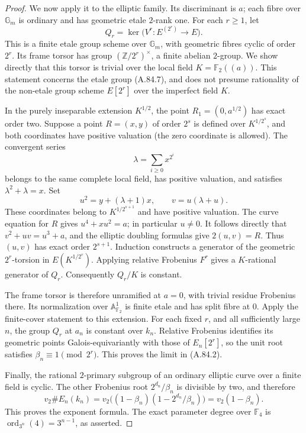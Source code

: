 \documentclass[11pt]{article}
\begin{document}
\begin{proof}
We now apply it to the elliptic family. Its discriminant is
\(a\); each fibre over \(\mathbb G_m\) is ordinary and
has geometric etale \(2\)-rank one. For each \(r\geq1\),
let
\[
 Q_r=\ker\bigl(V^r:E^{(2^r)}\longrightarrow E\bigr).
 \tag{A.84.7}
\]
This is a finite etale group scheme over \(\mathbb G_m\),
with geometric fibres cyclic of order \(2^r\). Its frame
torsor has group \((\mathbb Z/2^r)^\times\), a finite
abelian \(2\)-group. We show directly that this torsor is
trivial over the local field \(K=\mathbb F_2((a))\).
This statement concerns the etale group (A.84.7), and does
not presume rationality of the non-etale group scheme
\(E[2^r]\) over the imperfect field \(K\).

In the purely inseparable extension \(K^{1/2}\), the point
\(R_1=(0,a^{1/2})\) has exact order two. Suppose a point
\(R=(x,y)\) of order \(2^s\) is defined over
\(K^{1/2^s}\), and both coordinates have positive valuation
(the zero coordinate is allowed). The convergent series
\[
                  \lambda=\sum_{i\geq0}x^{2^i}
 \tag{A.84.8}
\]
belongs to the same complete local field, has positive
valuation, and satisfies \(\lambda^2+\lambda=x\).
Set
\[
 u^2=y+(\lambda+1)x,\qquad v=u(\lambda+u).
 \tag{A.84.9}
\]
These coordinates belong to \(K^{1/2^{s+1}}\) and have
positive valuation. The curve equation for \(R\) gives
\(u^4+xu^2=a\); in particular \(u\ne0\).
It follows directly that \(v^2+uv=u^3+a\), and the
elliptic doubling formulas give \(2(u,v)=R\).
Thus \((u,v)\) has exact order \(2^{s+1}\).
Induction constructs a generator of the geometric
\(2^r\)-torsion in \(E(K^{1/2^r})\).
Applying relative Frobenius \(F^r\) gives a \(K\)-rational
generator of \(Q_r\). Consequently \(Q_r/K\) is constant.

The frame torsor is therefore unramified at \(a=0\),
with trivial residue Frobenius there. Its normalization over
\(\mathbb A^1_{\mathbb F_2}\) is finite etale and has split
fibre at \(0\). Apply the finite-cover statement to this
extension. For each fixed \(r\), and all sufficiently large
\(n\), the group \(Q_r\) at \(a_n\) is constant over
\(k_n\). Relative Frobenius identifies its geometric points
Galois-equivariantly with those of \(E_n[2^r]\), so the
unit root satisfies \(\beta_n\equiv1\pmod{2^r}\).
This proves the limit in (A.84.2).

Finally, the rational \(2\)-primary subgroup of an ordinary
elliptic curve over a finite field is cyclic. The other
Frobenius root \(2^{d_n}/\beta_n\) is divisible by two,
and therefore
\[
 v_2\#E_n(k_n)
 =v_2\bigl((1-\beta_n)
              (1-2^{d_n}/\beta_n)\bigr)
 =v_2(1-\beta_n).
\]
This proves the exponent formula. The exact parameter degree
over \(\mathbb F_4\) is \(\operatorname{ord}_{3^n}(4)
=3^{n-1}\), as asserted.
\end{proof}
\end{document}
